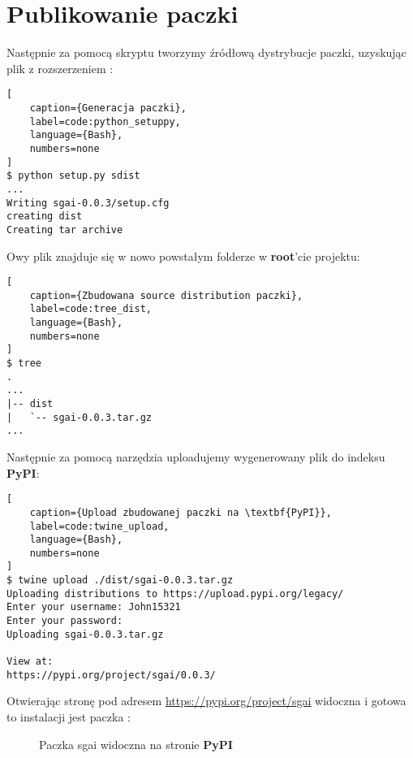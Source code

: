 \clearpage

\section{Publikowanie paczki}


Następnie za pomocą skryptu  tworzymy źródłową dystrybucje paczki, uzyskując plik z rozszerzeniem :

\begin{onepage}
    \begin{lstlisting}[
    caption={Generacja paczki},
    label=code:python_setuppy,
    language={Bash},
    numbers=none
]
$ python setup.py sdist
...
Writing sgai-0.0.3/setup.cfg
creating dist
Creating tar archive
    \end{lstlisting}
\end{onepage}


Owy plik znajduje się w nowo powstałym folderze  w \textbf{root}'cie projektu:

\begin{onepage}
    \begin{lstlisting}[
    caption={Zbudowana source distribution paczki},
    label=code:tree_dist,
    language={Bash},
    numbers=none
]
$ tree
.
...
|-- dist
|   `-- sgai-0.0.3.tar.gz
...
    \end{lstlisting}
\end{onepage}


Następnie za pomocą narzędzia  uploadujemy wygenerowany plik do indeksu \textbf{PyPI}:

\begin{onepage}
    \begin{lstlisting}[
    caption={Upload zbudowanej paczki na \textbf{PyPI}},
    label=code:twine_upload,
    language={Bash},
    numbers=none
]
$ twine upload ./dist/sgai-0.0.3.tar.gz
Uploading distributions to https://upload.pypi.org/legacy/
Enter your username: John15321
Enter your password:
Uploading sgai-0.0.3.tar.gz

View at:
https://pypi.org/project/sgai/0.0.3/
    \end{lstlisting}
\end{onepage}

\clearpage

Otwierając stronę pod adresem \url{https://pypi.org/project/sgai} widoczna i gotowa to instalacji jest paczka :

\begin{figure}[h]
    \centering
    \caption{Paczka sgai widoczna na stronie \textbf{PyPI}}
    \label{img:sgai_on_pypi}
\end{figure}

